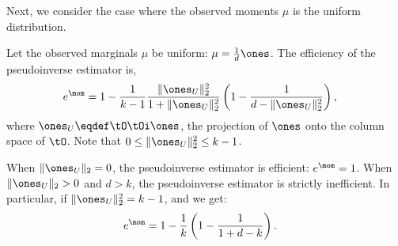 Next, we consider the case where the observed moments $\mu$ is the
uniform distribution.

\begin{lemma}
  Let the observed marginals $\mu$ be uniform: $\mu = \frac{1}{d} \ones$. 
  The efficiency of the pseudoinverse estimator is, 
  \begin{align}
    e^\mom &= 
    1 - \frac{1}{k-1}\frac{\|\ones_U\|_2^2}{1 + \|\ones_U\|_2^2} \left( 1 - \frac{1}{d - \|\ones_U\|_2^2} \right),
  \end{align}
  where $\ones_U \eqdef \tO\tOi \ones$, the projection of $\ones$ onto
  the column space of $\tO$. Note that $0 \le \|\ones_U\|^2_2 \le k - 1$.

  When $\|\ones_U\|_2 = 0$, the pseudoinverse estimator is efficient:
  $e^\mom = 1$. When $\|\ones_U\|_2 > 0$ and $d > k$, the pseudoinverse
  estimator is strictly inefficient. 
  In particular, if $\|\ones_U\|^2_2
    = k-1$, and we get:
    \begin{align}
      e^\mom 
      &= 1 - \frac{1}{k} \left(1 - \frac{1}{1 + d - k} \right).
    \end{align}

\end{lemma}
